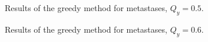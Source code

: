 \clearpage

\vspace*{\fill}
\begin{table}[h]
    \centering
    \caption{Results of the greedy method for metastases, $Q_y = 0.5$.}
    \label{tab:greedy_type_metastasis_yq_4_mw_0_C_3_D_2}
\end{table}

\begin{table}[h]
    \centering
    \caption{Results of the greedy method for metastases, $Q_y = 0.6$.}
    \label{tab:greedy_type_metastasis_yq_5_mw_0_C_3_D_2}
\end{table}
\vspace*{\fill}